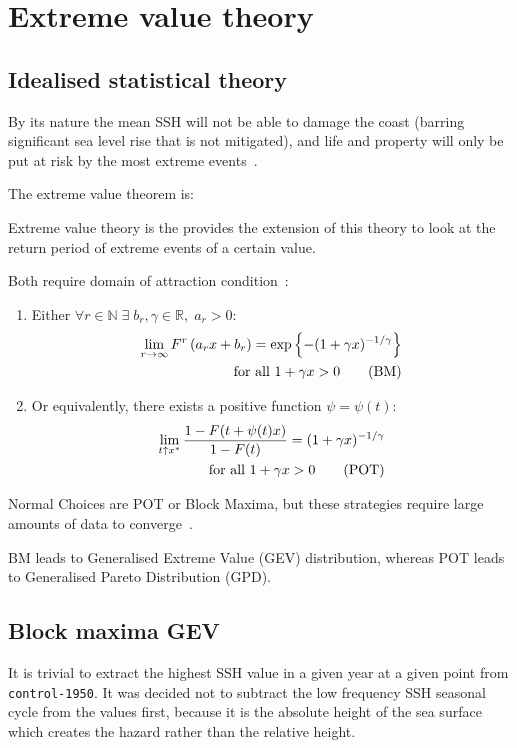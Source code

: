 \section{Extreme value theory}
\label{sec:evt}
\subsection{Idealised statistical theory}
By its nature the mean SSH will
not be able to damage the coast
(barring significant sea level rise that is not mitigated),
and life and property will only be put
at risk by the most extreme events~\cite{taleb2019statistical}.

The extreme value theorem is:



Extreme value theory is the provides the extension of this theory
to look at the return period of extreme events of a certain value.

Both require domain of attraction condition~\cite{bucher2018horse}:

\begin{enumerate}
  \item Either $\forall r \in \mathbb{N} \;\exists \;b_r, \gamma\in \mathbb{R},\; a_r>0: $
    \begin{eqnarray}
    \lim _{r \rightarrow \infty} F^{r}\left(a_{r} x+b_{r}\right)=\exp \left\{-(1+\gamma x)^{-1 / \gamma}\right\} \notag \\
     \text { for all } 1+\gamma x>0
    \tag{BM}
    \end{eqnarray}

  \item Or equivalently, there exists a positive function $\psi=\psi (t):$
    \begin{eqnarray}
    \lim _{t \uparrow x^{*}} \frac{1-F(t+\psi(t) x)}{1-F(t)}=(1+\gamma x)^{-1 / \gamma} \notag \\
    \text { for all } 1+\gamma x>0
    \tag{POT}
    \end{eqnarray}
 \end{enumerate}

Normal Choices are POT or Block Maxima, but these strategies require
large amounts of data to converge~\cite{taleb2019much}.

BM leads to Generalised Extreme Value (GEV) distribution,
      whereas POT leads to Generalised Pareto Distribution (GPD).

\subsection{Block maxima GEV}
It is trivial to extract the highest SSH value in a given year at a given point
from \texttt{control-1950}.
It was decided not to subtract the low frequency SSH seasonal cycle from the
values first, because it is the absolute height of the sea surface which
creates the hazard rather than the relative height.

